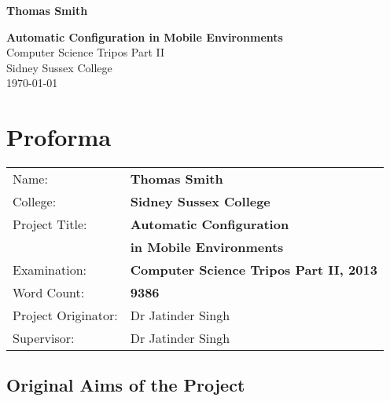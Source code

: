 \documentclass[12pt,twoside,notitlepage]{report}
\begin{document}





\pagestyle{empty}

\hfill{\LARGE \bf Thomas Smith}

\vspace*{60mm}
\begin{center}
\Huge
{\bf Automatic Configuration in Mobile Environments} \\
\vspace*{5mm}
Computer Science Tripos Part II \\
\vspace*{5mm}
Sidney Sussex College \\
\vspace*{5mm}
\today  %
\end{center}

\cleardoublepage


\setcounter{page}{1}
\pagestyle{plain}

\chapter*{Proforma}

{\large
\begin{tabular}{ll}
Name:               & \bf Thomas Smith	\\
College:            & \bf Sidney Sussex College	\\
Project Title:      & \bf Automatic Configuration \\ &\bf in Mobile Environments	\\
Examination:        & \bf Computer Science Tripos Part II, 2013 	\\
Word Count:         & \bf 9386\footnotemark[1] \\
Project Originator: & Dr Jatinder Singh		\\
Supervisor:         & Dr Jatinder Singh		\\ 
\end{tabular}
}



\section*{Original Aims of the Project}
\end{document}
